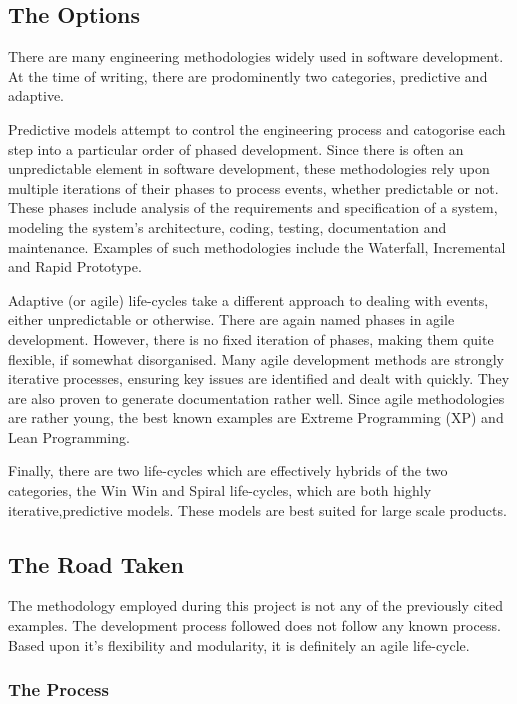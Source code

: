 
\subsection{The Options}

There are many engineering methodologies widely used in software
development. At the time of writing, there are prodominently two
categories, predictive and adaptive.


Predictive models attempt to control the engineering process and
catogorise each step into a particular order of phased development. 
Since there is often an unpredictable element in software development, 
these methodologies rely upon multiple iterations of their phases to 
process events, whether predictable or not. These phases include 
analysis of the requirements and specification of a system, modeling 
the system's architecture, coding, testing, documentation and 
maintenance. Examples of such methodologies include the Waterfall, 
Incremental and Rapid Prototype.


Adaptive (or agile) life-cycles take a different approach to dealing 
with events, either unpredictable or otherwise. There are again named 
phases in agile development. However, there is no fixed iteration of 
phases, making them quite flexible, if somewhat disorganised. Many 
agile development methods are strongly iterative processes, ensuring key 
issues are identified and dealt with quickly. They are also proven to
generate documentation rather well. Since agile methodologies are rather 
young, the best known examples are Extreme Programming (XP) and Lean 
Programming.


Finally, there are two life-cycles which are effectively hybrids of the
two categories, the Win Win and Spiral life-cycles, which are both highly
iterative,predictive models. These models are best suited for large
scale products.

\subsection{The Road Taken}

The methodology employed during this project is not any of the
previously cited examples. The development process followed does not 
follow any known process. Based upon it's flexibility and modularity, 
it is definitely an agile life-cycle.

\subsubsection{The Process}

